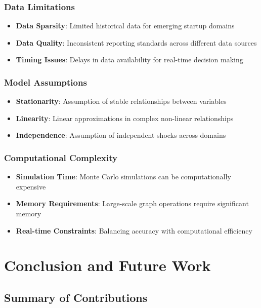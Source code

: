 \documentclass[conference]{IEEEtran}
\begin{document}
\subsubsection{Data Limitations}
\begin{itemize}
    \item \textbf{Data Sparsity}: Limited historical data for emerging startup domains
    \item \textbf{Data Quality}: Inconsistent reporting standards across different data sources
    \item \textbf{Timing Issues}: Delays in data availability for real-time decision making
\end{itemize}

\subsubsection{Model Assumptions}
\begin{itemize}
    \item \textbf{Stationarity}: Assumption of stable relationships between variables
    \item \textbf{Linearity}: Linear approximations in complex non-linear relationships
    \item \textbf{Independence}: Assumption of independent shocks across domains
\end{itemize}

\subsubsection{Computational Complexity}
\begin{itemize}
    \item \textbf{Simulation Time}: Monte Carlo simulations can be computationally expensive
    \item \textbf{Memory Requirements}: Large-scale graph operations require significant memory
    \item \textbf{Real-time Constraints}: Balancing accuracy with computational efficiency
\end{itemize}

\section{Conclusion and Future Work}

\subsection{Summary of Contributions}
\end{document}
